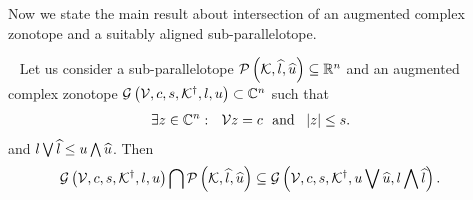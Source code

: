 %
Now we state the main result about intersection of an augmented
complex zonotope and a suitably aligned sub-parallelotope.
%
\begin{theorem}~\label{thm:acz-ptope-intersection}
Let us consider a sub-parallelotope $\mathcal{P}\left(\mathcal{K},\widehat{l},\widehat{u}\right)\subseteq\mathbb{R}^n$ and an
augmented complex zonotope
$\mathcal{G}\left(\mathcal{V},c,s,{\mathcal{K}}^\dagger,l,u\right)\subset\mathbb{C}^n$
such that 
%
\begin{align}
& \exists z\in\mathbb{C}^n:~~\mathcal{V} z=c~~\text{and}~~\left|z\right|\leq s.~\label{eqn:contain-origin}
\end{align}
%
and $l\bigvee \widehat{l}\leq u\bigwedge \widehat{u}$.
Then
%
\begin{align}
&
\mathcal{G}\left(\mathcal{V},c,s,{\mathcal{K}}^\dagger,l,u\right)\bigcap \mathcal{P}\left(\mathcal{K},\widehat{l},\widehat{u}\right)\nonumber
 \subseteq\mathcal{G}\left(\mathcal{V},c,s,{\mathcal{K}}^\dagger,u\bigvee \widehat{u},l\bigwedge \widehat{l}\right).~\label{eqn:thm:acz-ptope-intersection}
\end{align}
%
\end{theorem}
%
